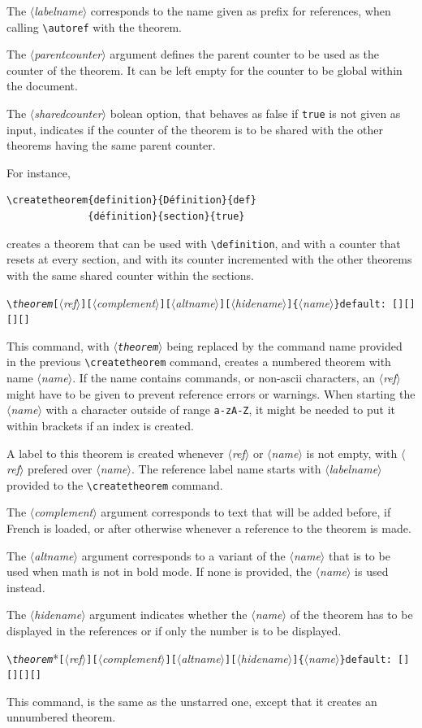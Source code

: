 \documentclass[12pt, babellanguage=british, titlespace, defaulttheorems]{altarticle}
\newcommand{\aargt}[1]{\ensuremath{\langle}\textrm{{\emph{#1}}}\ensuremath{\rangle}}
\newcommand{\argt}[1]{\texttt{\{}\ensuremath{\langle}\textrm{{\emph{#1}}}\ensuremath{\rangle}\texttt{\}}}
\newcommand{\optargt}[1]{\texttt{[}\ensuremath{\langle}\textrm{\emph{#1}}\ensuremath{\rangle}\texttt{]}}
\newcommand{\commandline}[1][]{\def\argI{#1}\ccommandline}
\newcommand{\ccommandline}[2][]{\par\medskip\hspace*{-.75cm}\texttt{\textbackslash#2}\argI{}\hfill\if\relax\detokenize{#1}\relax\else\texttt{default:~#1}\fi\par}
\begin{document}
The \aargt{labelname} corresponds to the name given as prefix for references, when calling \texttt{\textbackslash autoref} with the theorem.

The \aargt{parentcounter} argument defines the parent counter to be used as the counter of the theorem. It can be left empty for the counter to be global within the document.

The \aargt{sharedcounter} bolean option, that behaves as false if \texttt{true} is not given as input, indicates if the counter of the theorem is to be shared with the other theorems having the same parent counter.

For instance,
\begin{verbatim}
\createtheorem{definition}{Définition}{def}
              {définition}{section}{true}
\end{verbatim}
creates a theorem that can be used with \texttt{\textbackslash definition}, and with a counter that resets at every section, and with its counter incremented with the other theorems with the same shared counter within the sections.
\commandline[\optargt{ref}\optargt{complement}\optargt{altname}\optargt{hidename}\argt{name}][{[][][][]}]{\emph{theorem}}
This command, with \texttt{\aargt{theorem}} being replaced by the command name provided in the previous \texttt{\textbackslash createtheorem} command, creates a numbered theorem with name \aargt{name}. If the name contains commands, or non-ascii characters, an \aargt{ref} might have to be given to prevent reference errors or warnings. When starting the \aargt{name} with a character outside of range \texttt{a-zA-Z}, it might be needed to put it within brackets if an index is created.

A label to this theorem is created whenever \aargt{ref} or \aargt{name} is not empty, with \aargt{ref} prefered over \aargt{name}. The reference label name starts with \aargt{labelname} provided to the \texttt{\textbackslash createtheorem} command.

The \aargt{complement} argument corresponds to text that will be added before, if French is loaded, or after otherwise whenever a reference to the theorem is made.

The \aargt{altname} argument corresponds to a variant of the \aargt{name} that is to be used when math is not in bold mode. If none is provided, the \aargt{name} is used instead.

The \aargt{hidename} argument indicates whether the \aargt{name} of the theorem has to be displayed in the references or if only the number is to be displayed.
\commandline[*\optargt{ref}\optargt{complement}\optargt{altname}\optargt{hidename}\argt{name}][{[][][][]}]{\emph{theorem}}
This command, is the same as the unstarred one, except that it creates an unnumbered theorem.
\end{document}
